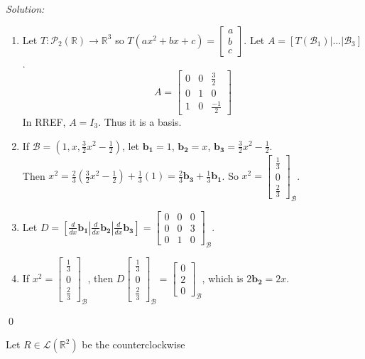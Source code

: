 \documentclass[12 pt]{article}
\newenvironment{problem}[2][Problem]{\begin{trivlist}
\item[\hskip \labelsep {\bfseries #1}\hskip \labelsep {\bfseries #2.}]}{\end{trivlist}}
\newenvironment{sol}
    {\emph{Solution:}
    }
    {
    \qed
    }
\theoremstyle{definition}
\newcommand{\R}{\mathbb{R}} %
\newcommand{\lin}[1]{\mathscr{L}(#1)}
\newcommand{\poly}[2]{\mathscr{P}_#2(#1)}
\newcommand{\s}[1]{\mathscr{#1}}
\newcommand{\vo}[1]{\mathbf{#1}}
\newcommand{\ddx}{\frac{d}{dx}}
\begin{document}
\begin{sol}
\begin{enumerate}[label=(\alph*)]
    \item Let $T: \poly{\R}{2}\to \R^3$ so $T(ax^2+bx+c)=\begin{bmatrix}
    a\\b\\c
    \end{bmatrix}$. Let $A=[T(\mathscr{B_1})|\dots|\mathscr{B_3}]$.
    \[A=\begin{bmatrix}
    0 & 0 & \frac{3}{2}\\
    0 & 1 & 0\\
    1 & 0 & \frac{-1}{2}
    \end{bmatrix}\]
    \newcommand{\vb}[1]{\vo{b_{#1}}}
    In RREF, $A=I_3$. Thus it is a basis.
    \item If $\mathscr{B}=(1,x,\frac{3}{2}x^2-\frac{1}{2})$, let $\vb{1}=1$, $\vb{2}=x$, $\vb{3}=\frac{3}{2}x^2-\frac{1}{2}$.\\
    Then $x^2=\frac{2}{3}(\frac{3}{2}x^2-\frac{1}{2})+\frac{1}{3}(1)=\frac{2}{3}\vb{3}+\frac{1}{3}\vb{1}$. So $x^2 = \begin{bmatrix}
    \frac{1}{3 }\\0\\\frac{2}{3}
    \end{bmatrix}_\s{B}$.
    \item Let $D=[\ddx\vb{1}|\ddx\vb{2}|\ddx\vb{3}]=\begin{bmatrix}
    0 & 0 & 0\\
    0 & 0 & 3\\
    0 & 1 & 0
    \end{bmatrix}_\s{B}$.
    \item If $x^2=\begin{bmatrix}\frac{1}{3}\\0\\\frac{2}{3}\end{bmatrix}_\s{B}$, then $D\begin{bmatrix}\frac{1}{3}\\0\\\frac{2}{3}\end{bmatrix}_\s{B}=\begin{bmatrix}
    0\\
    2\\
    0
    \end{bmatrix}_\s{B}$, which is $2\vb{2}=2x$. 
\end{enumerate}
\end{sol}

\begin{problem}{3.5.14a}
Let $R\in\lin{\R^2}$ be the counterclockwise 
\end{problem}
\end{document}
